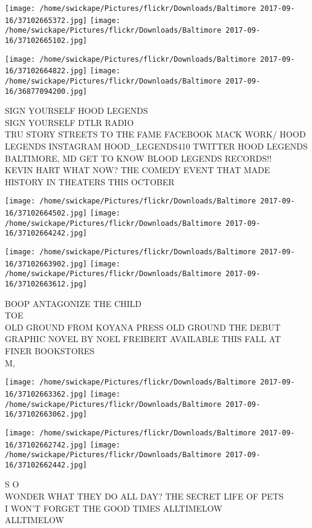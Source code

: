 \documentclass[10pt,letterpaper]{article}
\begin{document}
\texttt{[image: /home/swickape/Pictures/flickr/Downloads/Baltimore 2017-09-16/37102665372.jpg]}
\texttt{[image: /home/swickape/Pictures/flickr/Downloads/Baltimore 2017-09-16/37102665102.jpg]}

\texttt{[image: /home/swickape/Pictures/flickr/Downloads/Baltimore 2017-09-16/37102664822.jpg]}
\texttt{[image: /home/swickape/Pictures/flickr/Downloads/Baltimore 2017-09-16/36877094200.jpg]}

SIGN YOURSELF HOOD LEGENDS\\
SIGN YOURSELF DTLR RADIO\\
TRU STORY STREETS TO THE FAME FACEBOOK MACK WORK/ HOOD LEGENDS INSTAGRAM HOOD\_LEGENDS410 TWITTER HOOD LEGENDS BALTIMORE, MD GET TO KNOW BLOOD LEGENDS RECORDS!!\\
KEVIN HART WHAT NOW?  THE COMEDY EVENT THAT MADE HISTORY IN THEATERS THIS OCTOBER
\pagebreak

\texttt{[image: /home/swickape/Pictures/flickr/Downloads/Baltimore 2017-09-16/37102664502.jpg]}
\texttt{[image: /home/swickape/Pictures/flickr/Downloads/Baltimore 2017-09-16/37102664242.jpg]}

\texttt{[image: /home/swickape/Pictures/flickr/Downloads/Baltimore 2017-09-16/37102663902.jpg]}
\texttt{[image: /home/swickape/Pictures/flickr/Downloads/Baltimore 2017-09-16/37102663612.jpg]}

BOOP ANTAGONIZE THE CHILD\\
TOE\\
OLD GROUND FROM KOYANA PRESS OLD GROUND THE DEBUT GRAPHIC NOVEL BY NOEL FREIBERT AVAILABLE THIS FALL AT FINER BOOKSTORES\\
M,
\pagebreak

\texttt{[image: /home/swickape/Pictures/flickr/Downloads/Baltimore 2017-09-16/37102663362.jpg]}
\texttt{[image: /home/swickape/Pictures/flickr/Downloads/Baltimore 2017-09-16/37102663062.jpg]}

\texttt{[image: /home/swickape/Pictures/flickr/Downloads/Baltimore 2017-09-16/37102662742.jpg]}
\texttt{[image: /home/swickape/Pictures/flickr/Downloads/Baltimore 2017-09-16/37102662442.jpg]}

S O\\
WONDER WHAT THEY DO ALL DAY?  THE SECRET LIFE OF PETS\\
I WON'T FORGET THE GOOD TIMES ALLTIMELOW\\
ALLTIMELOW
\pagebreak
\end{document}
